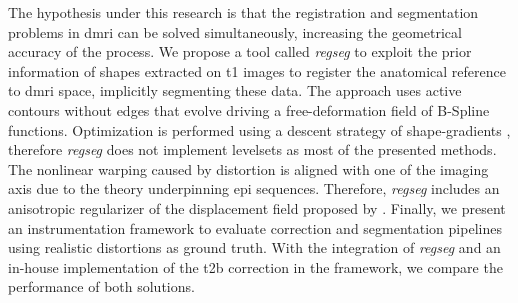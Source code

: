 The hypothesis under this research is that the registration and segmentation
  problems in \gls*{dmri} can be solved simultaneously, increasing the geometrical
  accuracy of the process.
We propose a tool called \emph{regseg} to exploit the prior information of shapes
  extracted on \gls*{t1} images to register the anatomical reference
  to \gls*{dmri} space, implicitly segmenting these data.
The approach uses active contours without edges \citep{chan_active_2001} that evolve driving a
  free-deformation field of B-Spline functions.
Optimization is performed using a descent strategy of shape-gradients
  \citep{besson_dream2s_2003,herbulot_segmentation_2006}, therefore \emph{regseg}
  does not implement levelsets as most of the presented methods.
The nonlinear warping caused by distortion is aligned with one of the imaging axis due
  to the theory underpinning \gls*{epi} sequences.
Therefore, \emph{regseg} includes an anisotropic regularizer of the displacement field 
  proposed by \cite{nagel_investigation_1986}.
Finally, we present an instrumentation framework to evaluate correction and
  segmentation pipelines using realistic distortions as ground truth.
With the integration of \emph{regseg} and an in-house implementation of the 
  \gls*{t2b} correction in the framework, we compare the performance
  of both solutions.

